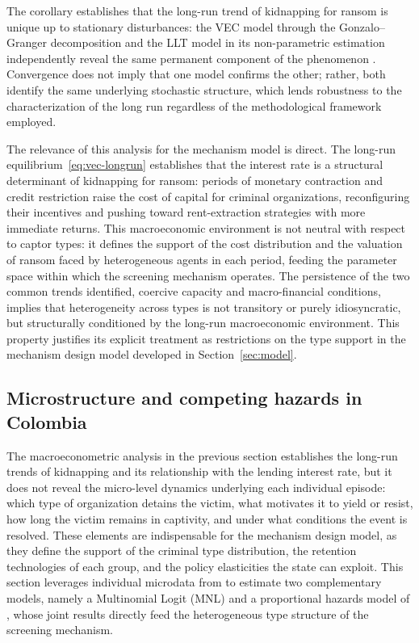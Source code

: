 \documentclass[ecta,nameyear,draft]{econsocart}
\theoremstyle{plain}
\theoremstyle{definition}
\newcommand{\1}{\mathbf{1}}
\begin{document}
The corollary establishes that the long-run trend of kidnapping for ransom is unique up to stationary disturbances: the VEC model through the Gonzalo--Granger decomposition and the LLT model in its non-parametric estimation independently reveal the same permanent component of the phenomenon \citet{GonzaloGranger1995}. Convergence does not imply that one model confirms the other; rather, both identify the same underlying stochastic structure, which lends robustness to the characterization of the long run regardless of the methodological framework employed.

The relevance of this analysis for the mechanism model is direct. The long-run equilibrium~\eqref{eq:vec-longrun} establishes that the interest rate is a structural determinant of kidnapping for ransom: periods of monetary contraction and credit restriction raise the cost of capital for criminal organizations, reconfiguring their incentives and pushing toward rent-extraction strategies with more immediate returns. This macroeconomic environment is not neutral with respect to captor types: it defines the support of the cost distribution and the valuation of ransom faced by heterogeneous agents in each period, feeding the parameter space within which the screening mechanism operates. The persistence of the two common trends identified, coercive capacity and macro-financial conditions, implies that heterogeneity across types is not transitory or purely idiosyncratic, but structurally conditioned by the long-run macroeconomic environment. This property justifies its explicit treatment as restrictions on the type support in the mechanism design model developed in Section~\ref{sec:model}.

\subsection{Microstructure and competing hazards in Colombia}\label{sec:empirico}

The macroeconometric analysis in the previous section establishes the long-run trends of kidnapping and its relationship with the lending interest rate, but it does not reveal the micro-level dynamics underlying each individual episode: which type of organization detains the victim, what motivates it to yield or resist, how long the victim remains in captivity, and under what conditions the event is resolved. These elements are indispensable for the mechanism design model, as they define the support of the criminal type distribution, the retention technologies of each group, and the policy elasticities the state can exploit. This section leverages individual microdata from \citet{cnmh_datos} to estimate two complementary models, namely a Multinomial Logit (MNL) and a proportional hazards model of \citet{Cox1972}, whose joint results directly feed the heterogeneous type structure of the screening mechanism.
\end{document}
